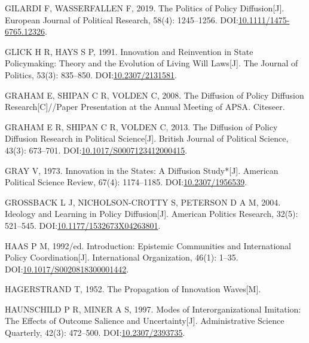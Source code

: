\documentclass[
  12pt,
]{ctexart}
\newlength{\cslhangindent}
\newlength{\cslentryspacingunit} %
\newenvironment{CSLReferences}[2] %
 {%
  \setlength{\parindent}{0pt}
  \ifodd #1
  \let\oldpar\par
  \def\par{\hangindent=\cslhangindent\oldpar}
  \fi
  \setlength{\parskip}{#2\cslentryspacingunit}
 }%
 {}
\begin{document}
\begin{CSLReferences}{1}{0}
\leavevmode{}%
GILARDI F, WASSERFALLEN F, 2019. The Politics of Policy Diffusion{[}J{]}. European Journal of Political Research, 58(4): 1245--1256. DOI:\href{https://doi.org/10.1111/1475-6765.12326}{10.1111/1475-6765.12326}.

\leavevmode{}%
GLICK H R, HAYS S P, 1991. Innovation and {Reinvention} in {State Policymaking}: {Theory} and the {Evolution} of {Living Will Laws}{[}J{]}. The Journal of Politics, 53(3): 835--850. DOI:\href{https://doi.org/10.2307/2131581}{10.2307/2131581}.

\leavevmode{}%
GRAHAM E, SHIPAN C R, VOLDEN C, 2008. The Diffusion of Policy Diffusion Research{[}C{]}//Paper Presentation at the {Annual Meeting} of {APSA}. {Citeseer}.

\leavevmode{}%
GRAHAM E R, SHIPAN C R, VOLDEN C, 2013. The {Diffusion} of {Policy Diffusion Research} in {Political Science}{[}J{]}. British Journal of Political Science, 43(3): 673--701. DOI:\href{https://doi.org/10.1017/S0007123412000415}{10.1017/S0007123412000415}.

\leavevmode{}%
GRAY V, 1973. Innovation in the {States}: {A Diffusion Study}*{[}J{]}. American Political Science Review, 67(4): 1174--1185. DOI:\href{https://doi.org/10.2307/1956539}{10.2307/1956539}.

\leavevmode{}%
GROSSBACK L J, NICHOLSON-CROTTY S, PETERSON D A M, 2004. Ideology and {Learning} in {Policy Diffusion}{[}J{]}. American Politics Research, 32(5): 521--545. DOI:\href{https://doi.org/10.1177/1532673X04263801}{10.1177/1532673X04263801}.

\leavevmode{}%
HAAS P M, 1992/ed. Introduction: Epistemic Communities and International Policy Coordination{[}J{]}. International Organization, 46(1): 1--35. DOI:\href{https://doi.org/10.1017/S0020818300001442}{10.1017/S0020818300001442}.

\leavevmode{}%
HAGERSTRAND T, 1952. The Propagation of Innovation Waves{[}M{]}.

\leavevmode{}%
HAUNSCHILD P R, MINER A S, 1997. Modes of {Interorganizational Imitation}: {The Effects} of {Outcome Salience} and {Uncertainty}{[}J{]}. Administrative Science Quarterly, 42(3): 472--500. DOI:\href{https://doi.org/10.2307/2393735}{10.2307/2393735}.


\end{CSLReferences}
\end{document}
